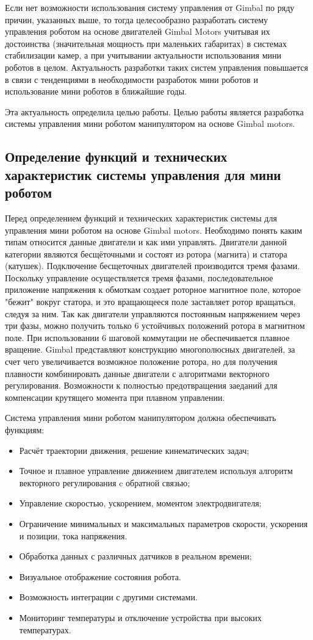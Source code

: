 Если нет возможности использования систему управления от Gimbal по ряду причин, указанных выше, то тогда целесообразно разработать систему управления роботом на основе двигателей Gimbal Motors учитывая их достоинства (значительная мощность при маленьких габаритах) в системах стабилизации камер, а при учитывании актуальности использования мини роботов в целом. Актуальность разработки таких систем управления повышается в связи с тенденциями в необходимости разработок мини роботов и использование мини роботов в ближайшие годы.

Эта актуальность определила целью работы. Целью работы является разработка системы управления мини роботом манипулятором на основе Gimbal motors.

\subsection{Определение функций и технических характеристик системы управления для мини роботом}

Перед определением функций и технических характеристик системы для управления мини роботом на основе Gimbal motors. Необходимо понять каким типам относится данные двигатели и как ими управлять.  Двигатели данной категории являются бесщёточными и состоят из ротора (магнита) и статора (катушек). Подключение бесщеточных двигателей производится тремя фазами. Поскольку управление осуществляется тремя фазами, последовательное приложение напряжения к обмоткам создает роторное магнитное поле, которое "бежит" вокруг статора, и это вращающееся поле заставляет ротор вращаться, следуя за ним.  Так как двигатели управляются постоянным напряжением через три фазы, можно получить только 6 устойчивых положений ротора в магнитном поле. При использовании 6 шаговой коммутации не обеспечивается плавное вращение. Gimbal представляют конструкцию многополюсных двигателей, за счет чего увеличивается возможное положение ротора, но для получения плавности комбинировать данные двигатели с алгоритмами векторного регулирования. Возможности к полностью предотвращения заеданий для компенсации крутящего момента при плавном управлении.

Система управления мини роботом манипулятором должна обеспечивать функциям:
\begin{itemize}
    \item Расчёт траектории движения, решение кинематических задач;
    \item Точное и плавное управление движением двигателем используя алгоритм векторного регулирования c обратной связью;
    \item Управление скоростью, ускорением, моментом электродвигателя;
    \item Ограничение минимальных и максимальных параметров скорости, ускорения и позиции, тока напряжения.
    \item Обработка данных с различных датчиков в реальном времени;
    \item Визуальное отображение состояния робота.
    \item Возможность интеграции с другими системами.
    \item Мониторинг температуры и отключение устройства при высоких температурах.
\end{itemize}

